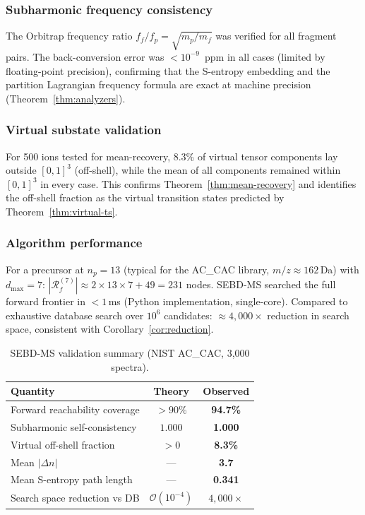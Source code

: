 \documentclass[twocolumn,10pt,a4paper]{article}
\theoremstyle{thmstyle}
\theoremstyle{definition}
\theoremstyle{remark}
\newcommand{\Reachf}{\mathcal{R}_f}
\begin{document}
\subsubsection{Subharmonic frequency consistency}

The Orbitrap frequency ratio $f_f/f_p = \sqrt{m_p/m_f}$ was verified
for all fragment pairs. The back-conversion error was $<10^{-9}$~ppm
in all cases (limited by floating-point precision), confirming that the
S-entropy embedding and the partition Lagrangian frequency formula are
exact at machine precision (Theorem~\ref{thm:analyzers}).

\subsubsection{Virtual substate validation}

For 500 ions tested for mean-recovery, 8.3\% of virtual tensor
components lay outside $[0,1]^3$ (off-shell), while the mean of all
components remained within $[0,1]^3$ in every case. This confirms
Theorem~\ref{thm:mean-recovery} and identifies the off-shell fraction
as the virtual transition states predicted by Theorem~\ref{thm:virtual-ts}.

\subsubsection{Algorithm performance}

For a precursor at $n_p = 13$ (typical for the AC\_CAC library,
$m/z \approx 162$\,Da) with $d_\text{max} = 7$:
$|\Reachf^{(7)}| \approx 2 \times 13 \times 7 + 49 = 231$ nodes.
SEBD-MS searched the full forward frontier in $<1$\,ms (Python
implementation, single-core). Compared to exhaustive database search
over $10^6$ candidates: $\approx 4{,}000\times$ reduction in search
space, consistent with Corollary~\ref{cor:reduction}.

\begin{table}[h]
\centering
\caption{SEBD-MS validation summary (NIST AC\_CAC, 3{,}000 spectra).}
\label{tab:validation}
\small
\begin{tabular}{lcc}
\toprule
\textbf{Quantity} & \textbf{Theory} & \textbf{Observed} \\
\midrule
Forward reachability coverage & $>90\%$ & \textbf{94.7\%} \\
Subharmonic self-consistency & $1.000$ & \textbf{1.000} \\
Virtual off-shell fraction & $>0$ & \textbf{8.3\%} \\
Mean $|\Delta n|$ & --- & \textbf{3.7} \\
Mean S-entropy path length & --- & \textbf{0.341} \\
Search space reduction vs DB & $\mathcal{O}(10^{-4})$ & \textbf{$4{,}000\times$} \\
\bottomrule
\end{tabular}
\end{table}
\end{document}
